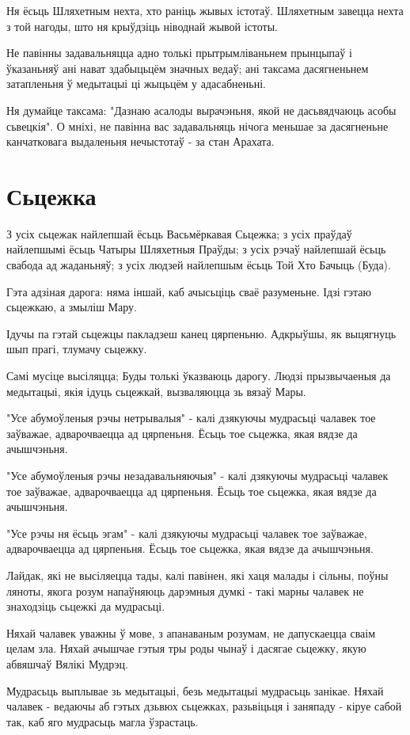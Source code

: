 \documentclass{article}
\begin{document}
Ня ёсьць Шляхетным нехта, хто раніць жывых істотаў. Шляхетным
завецца нехта з той нагоды, што ня крыўдзіць ніводнай жывой істоты.

Не павінны задавальняцца адно толькі прытрымліваньнем прынцыпаў і
ўказаньняў ані нават здабыцьцём значных ведаў; ані таксама дасягненьнем
затапленьня ў медытацыі ці жыцьцём у адасабненьні.

Ня думайце таксама: "Дазнаю асалоды вырачэньня, якой не
дасьвядчаюць асобы сьвецкія". О мніхі, не павінна вас задавальняць
нічога меньшае за дасягненьне канчатковага выдаленьня нечыстотаў - за
стан Арахата.

\section{Сьцежка}

З усіх сьцежак найлепшай ёсьць Васьмёркавая Сьцежка; з усіх праўдаў
найлепшымі ёсьць Чатыры Шляхетныя Праўды; з усіх рэчаў найлепшай ёсьць
свабода ад жаданьняў; з усіх людзей найлепшым ёсьць Той Хто Бачыць
(Буда).

Гэта адзіная дарога: няма іншай, каб ачысьціць сваё разуменьне.
Ідзі гэтаю сьцежкаю, а змыліш Мару.

Ідучы па гэтай сьцежцы пакладзеш канец цярпеньню. Адкрыўшы, як
выцягнуць шып прагі, тлумачу сьцежку.

Самі мусіце высіляцца; Буды толькі ўказваюць дарогу. Людзі
прызвычаеныя да медытацыі, якія ідуць сьцежкай, вызваляюцца зь вязаў
Мары.

"Усе абумоўленыя рэчы нетрывалыя" - калі дзякуючы мудрасьці чалавек
тое заўважае, адварочваецца ад цярпеньня. Ёсьць тое сьцежка, якая вядзе
да ачышчэньня.

"Усе абумоўленыя рэчы незадавальняючыя" - калі дзякуючы мудрасьці
чалавек тое заўважае, адварочваецца ад цярпеньня. Ёсьць тое сьцежка,
якая вядзе да ачышчэньня.

"Усе рэчы ня ёсьць эгам" - калі дзякуючы мудрасьці чалавек тое
заўважае, адварочваецца ад цярпеньня. Ёсьць тое сьцежка, якая вядзе да
ачышчэньня.

Лайдак, які не высіляецца тады, калі павінен, які хаця малады і
сільны, поўны ляноты, якога розум напаўняюць дарэмныя думкі - такі марны
чалавек не знаходзіць сьцежкі да мудрасьці.

Няхай чалавек уважны ў мове, з апанаваным розумам, не дапускаецца
сваім целам зла. Няхай ачышчае гэтыя тры роды чынаў і дасягае сьцежку,
якую абвяшчаў Вялікі Мудрэц.

Мудрасьць выплывае зь медытацыі, безь медытацыі мудрасьць занікае.
Няхай чалавек - ведаючы аб гэтых дзьвюх сьцежках, разьвіцьця і заняпаду
- кіруе сабой так, каб яго мудрасьць магла ўзрастаць.
\end{document}
